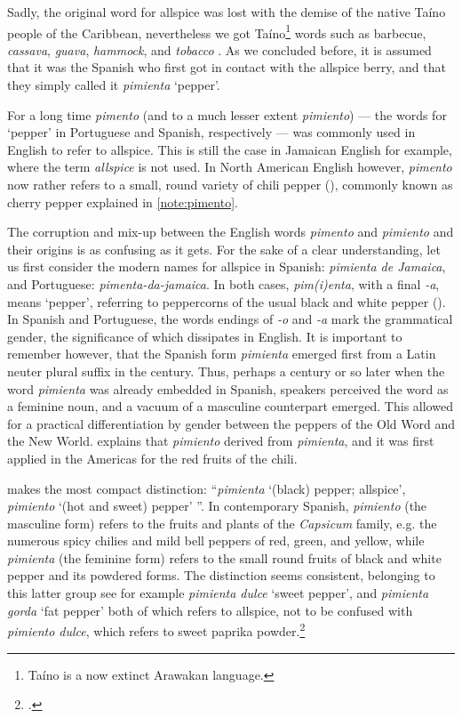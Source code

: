 Sadly, the original word for allspice was lost with the demise of the native Taíno people of the Caribbean, nevertheless we got Taíno\footnote{Taíno is a now extinct Arawakan language.} words such as barbecue, \textit{cassava}, \textit{guava}, \textit{hammock}, and \textit{tobacco} \autocite[229]{rafinesque_american_1836}. As we concluded before, it is assumed that it was the Spanish who first got in contact with the allspice berry, and that they simply called it \textit{pimienta} `pepper'.



For a long time \textit{pimento} (and to a much lesser extent \textit{pimiento}) --- the words for `pepper' in Portuguese and Spanish, respectively --- was commonly used in English to refer to allspice. This is still the case in Jamaican English for example, where the term \textit{allspice} is not used. In North American English however, \textit{pimento} now rather refers to a small, round variety of chili pepper (), commonly known as cherry pepper explained in \cref{note:pimento}. 

The corruption and mix-up between the English words \textit{pimento} and \textit{pimiento} and their origins is as confusing as it gets. For the sake of a clear understanding, let us first consider the modern names for allspice in Spanish: \textit{pimienta de Jamaica}, and Portuguese: \textit{pimenta-da-jamaica}. In both cases, \textit{pim\-(i)enta}, with a final \textit{-a}, means `pepper', referring to peppercorns of the usual black and white pepper (). In Spanish and Portuguese, the words endings of \textit{-o} and \textit{-a} mark the grammatical gender, the significance of which dissipates in English. It is important to remember however, that the Spanish form \textit{pimienta} emerged first from a Latin neuter plural suffix in the  century. Thus, perhaps a century or so later when the word \textit{pimienta} was already embedded in Spanish, speakers perceived the word as a feminine noun, and a vacuum of a masculine counterpart emerged. This allowed for a practical differentiation by gender between the peppers of the Old Word and the New World. \textcite[459]{corominas_breve_1987} explains that \textit{pimiento} derived from \textit{pimienta}, and it was first applied in the Americas for the red fruits of the chili.

\textcite[415]{gomez_de_silva_elseviers_1985} makes the most compact distinction: ``\textit{pimienta} `(black) pepper; allspice', \textit{pimiento} `(hot and sweet) pepper' ''. In contemporary Spanish, \textit{pimiento} (the masculine form) refers to the fruits and plants of the \textit{Capsicum} family, e.g. the numerous spicy chilies and mild bell peppers of red, green, and yellow, while \textit{pimienta} (the feminine form) refers to the small round fruits of black and white pepper and its powdered forms. The distinction seems consistent, belonging to this latter group see for example \textit{pimienta dulce} `sweet pepper', and \textit{pimienta gorda} `fat pepper' both of which refers to allspice, not to be confused with \textit{pimiento dulce}, which refers to sweet paprika powder.\footcite[pimiento, -a]{dle}

